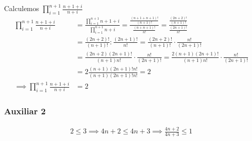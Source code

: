 \begin{enumerate}[label=\roman*)]
    Calculemos $\displaystyle \prod_{i=1}^{n+1} \frac{n+1+i}{n+i}$
    \begin{align*}
        \prod_{i=1}^{n+1} \frac{n+1+i}{n+i} &= \frac{\displaystyle \prod_{i=1}^{n+1} n+1+i}
        {\displaystyle \prod_{i=1}^{n+1} n+i} 
        = \frac{\displaystyle\frac{(n+1 + n+1)!}{(n+1)!}}{\displaystyle \frac{(n+n+1)!}{n!}}  
        = \frac{\displaystyle \frac{(2n+2)!}{(n+1)!}}{\displaystyle \frac{(2n+1)!}{n!}} \\
        &= \frac{(2n+2)!}{(n+1)!}: \frac{(2n+1)!}{n!} = \frac{(2n+2)!}{(n+1)!} \cdot \frac{n!}{(2n+1)!} \\ 
        &= \frac{(2n+2)(2n+1)!}{(n+1)n!} \cdot \frac{n!}{(2n+1)!}
        = \frac{2(n+1)(2n+1)!}{(n+1)n!} \cdot \frac{n!}{(2n+1)!} \\
        &= 2 \frac{(n+1)(2n+1)!n!}{(n+1)(2n+1)!n!} = 2 \\
        \implies \prod_{i=1}^{n+1} \frac{n+1+i}{n+i} &= 2
    \end{align*}

    \subsubsection*{Auxiliar 2}
    \begin{align*}
        2 \leq 3 \implies 4n + 2 \leq 4n + 3 \implies \frac{4n+2}{4n+3} \leq 1
    \end{align*}
\end{enumerate}
